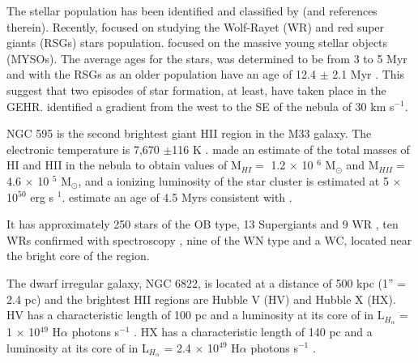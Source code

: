 \documentclass[fleqn,usenatbib, useAMS, a4paper]{mnras}
\begin{document}
The stellar population has been identified and classified by \citet{1996ApJ...456..174H} (and references therein).
Recently, \citet{2011MNRAS.411..235E} focused on studying the Wolf-Rayet (WR) and red super giants (RSGs) stars population.
\citet{2012AJ....143...43F} focused on the massive young stellar objects (MYSOs).
 The average ages for the stars, was determined to be from 3 to 5 Myr \citep{1996ApJ...456..174H} and with the RSGs as an older population have an age of 12.4 $\pm$ 2.1 Myr \citep{2011MNRAS.411..235E}.
This suggest that two episodes of star formation, at least, have taken place in the GEHR.
\citep{1984A&A...141...49H} identified a gradient from the west to the SE of the nebula of 30 km s$^{-1}$.

NGC 595 is the second brightest giant HII region in the M33 galaxy.
The electronic temperature is 7,670 $\pm$116 K \citep{2010MNRAS.402.1635R}.
\citet{1983A&A...119..185V} made an estimate of the total masses of HI and HII in the nebula to obtain values of M$_{HI}=$ 1.2 $\times$ 10 $^{6}$ M$_{\odot}$ and M$_{HII} =$ 4.6 $\times$ 10 $^{5}$ M$_{\odot}$, and a ionizing luminosity of the star cluster is estimated at 5 $\times$ 10$^{50}$ erg s $^{1}$.
\citet{1996AJ....111.1128M} estimate an age of 4.5 Myrs consistent with \citet{1993AJ....105.1400D}.

It has approximately 250 stars of the OB type, 13 Supergiants and 9 WR \citep{1996AJ....111.1128M}, ten WRs confirmed with spectroscopy \citet{1993AJ....105.1400D}, nine of the WN type and a WC, located near the bright core of the region.

The dwarf irregular galaxy, NGC 6822, is located at a distance of 500 kpc (1'' = 2.4 pc) \citep{1996AJ....112.1928G} and the brightest HII regions are Hubble V (HV) and Hubble X (HX).
HV has a characteristic length of 100 pc and a luminosity at its core of in L$_{H_\alpha}$ = 1 $\times$ 10$^{49}$ H$\alpha$ photons s$^{-1}$ \citep{1999PASP..111.1382O}.
HX has a characteristic length of 140 pc and a luminosity at its core of in L$_{H_\alpha}$ = 2.4 $\times$ 10$^{49}$ H$\alpha$ photons s$^{-1}$ \citep{1999PASP..111.1382O}.

\end{document}
